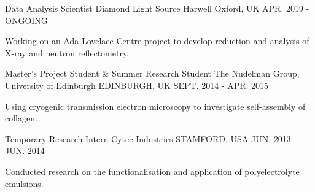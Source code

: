 \begin{cventries}
  \cventry
    {Data Analysis Scientist}
    {Diamond Light Source}
    {Harwell Oxford, UK}
    {APR. 2019 - ONGOING}
    {
      \begin{cvitems}
        \item {Working on an Ada Lovelace Centre project to develop reduction and analysis of X-ray and neutron reflectometry.}
      \end{cvitems}
    }
  \cventry
    {Master's Project Student \& Summer Research Student}
    {The Nudelman Group, University of Edinburgh}
    {EDINBURGH, UK}
    {SEPT. 2014 - APR. 2015}
    {
      \begin{cvitems}
        \item {Using cryogenic transmission electron microscopy to investigate self-assembly of collagen.}
      \end{cvitems}
    }
  \cventry
    {Temporary Research Intern}
    {Cytec Industries}
    {STAMFORD, USA}
    {JUN. 2013 - JUN. 2014}
    {
      \begin{cvitems}
        \item {Conducted research on the functionalisation and application of polyelectrolyte emulsions.}
      \end{cvitems}
    }
\end{cventries}
